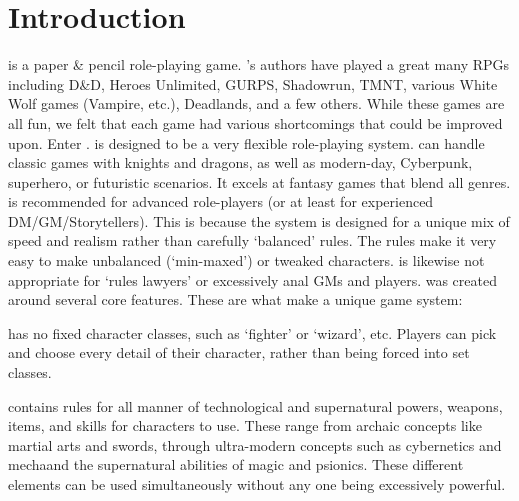 \documentclass[twoside]{book}
\begin{document}
\section{Introduction}
    \APATHY{}  is a paper \& pencil role-playing game.
            \APATHY{}'s authors have played a great many RPGs
            including D\&D, Heroes Unlimited, GURPS, Shadowrun, TMNT,
            various White Wolf games (Vampire, etc.), Deadlands, and a
            few others. While these games are all fun, we felt that each
            game had various shortcomings that could be improved upon.
            Enter \APATHY{}. \APATHY{}  is designed to be a very
            flexible role-playing system. \APATHY{}  can handle classic
            games with knights and dragons, as well as modern-day,
            Cyberpunk, superhero, or futuristic scenarios. It excels at
            fantasy games that blend all genres.
          \APATHY{}  is recommended for advanced role-players (or
            at least for experienced DM/GM/Storytellers). This is because
            the \APATHY{}  system is designed for a unique mix of speed
            and realism rather than carefully `balanced'
            rules. The \APATHY{}  rules make it very easy to make
            unbalanced (`min-maxed') or tweaked characters.
            \APATHY{}  is likewise not appropriate for `rules
            lawyers' or excessively anal GMs and players.
          \APATHY{}  was created around several core features.
            These are what make \APATHY{}  a unique game system:
            
              
               \APATHY{}  has no fixed character classes, such as
                `fighter' or `wizard', etc.
                Players can pick and choose every detail of their
                character, rather than being forced into set classes.
                
              
              
               \APATHY{}  contains rules for all manner of
                technological and supernatural powers, weapons, items,
                and skills for characters to use. These range from
                archaic concepts like martial arts and swords, through
                ultra-modern concepts such as cybernetics and
                mechaand the supernatural abilities of magic and
                psionics. These different elements can be used
                simultaneously without any one being excessively
                powerful.
                
\end{document}
